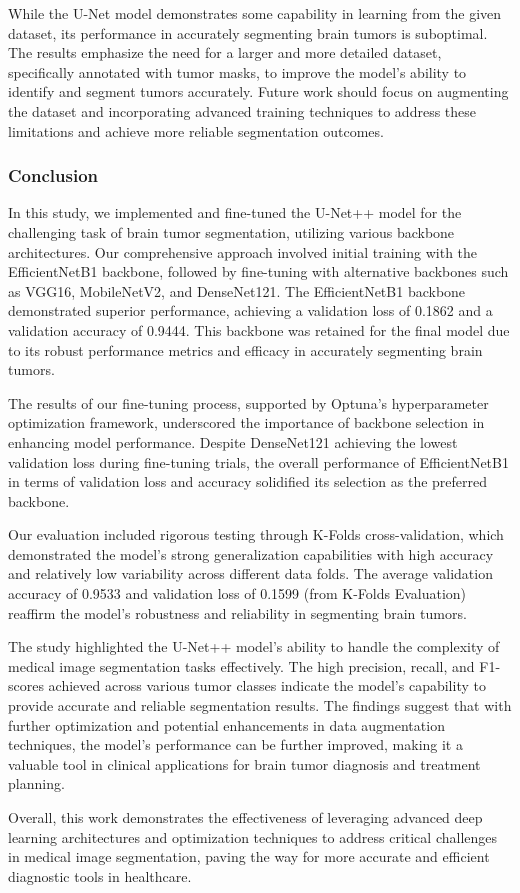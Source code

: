 While the U-Net model demonstrates some capability in learning from the given dataset, its performance in accurately segmenting brain tumors is suboptimal. The results emphasize the need for a larger and more detailed dataset, specifically annotated with tumor masks, to improve the model's ability to identify and segment tumors accurately. Future work should focus on augmenting the dataset and incorporating advanced training techniques to address these limitations and achieve more reliable segmentation outcomes.

\subsubsection{Conclusion}\label{s:conclusion}

In this study, we implemented and fine-tuned the U-Net++ model for the challenging task of brain tumor segmentation, utilizing various backbone architectures. Our comprehensive approach involved initial training with the EfficientNetB1 backbone, followed by fine-tuning with alternative backbones such as VGG16, MobileNetV2, and DenseNet121. The EfficientNetB1 backbone demonstrated superior performance, achieving a validation loss of 0.1862 and a validation accuracy of 0.9444. This backbone was retained for the final model due to its robust performance metrics and efficacy in accurately segmenting brain tumors.

The results of our fine-tuning process, supported by Optuna's hyperparameter optimization framework, underscored the importance of backbone selection in enhancing model performance. Despite DenseNet121 achieving the lowest validation loss during fine-tuning trials, the overall performance of EfficientNetB1 in terms of validation loss and accuracy solidified its selection as the preferred backbone.

Our evaluation included rigorous testing through K-Folds cross-validation, which demonstrated the model's strong generalization capabilities with high accuracy and relatively low variability across different data folds. The average validation accuracy of 0.9533 and validation loss of 0.1599 (from K-Folds Evaluation) reaffirm the model's robustness and reliability in segmenting brain tumors.

The study highlighted the U-Net++ model's ability to handle the complexity of medical image segmentation tasks effectively. The high precision, recall, and F1-scores achieved across various tumor classes indicate the model's capability to provide accurate and reliable segmentation results. The findings suggest that with further optimization and potential enhancements in data augmentation techniques, the model's performance can be further improved, making it a valuable tool in clinical applications for brain tumor diagnosis and treatment planning.

Overall, this work demonstrates the effectiveness of leveraging advanced deep learning architectures and optimization techniques to address critical challenges in medical image segmentation, paving the way for more accurate and efficient diagnostic tools in healthcare.


